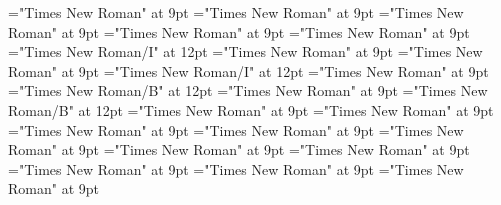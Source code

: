 \documentclass[gps1,twoside]{article}
\begin{document}
\font\spanspanrestrictionssensesensesentrybefore="Times New Roman" at 9pt
\font\spanrestrictionssensesensesentryfirstchildbefore="Times New Roman" at 9pt
\font\spanrestrictionssensesensesentrylastchildafter="Times New Roman" at 9pt
\font\spanspanlexsensereferencessensesensesentrybefore="Times New Roman" at 9pt
\font\lexsensereferencessensesensesentryafter="Times New Roman" at 9pt
\font\spanenownertypeabbreviationlexsensereferencelexsensereferencessensesensesentry="Times New Roman/I" at 12pt
\font\spanspanownertypeabbreviationlexsensereferencelexsensereferencessensesensesentrybefore="Times New Roman" at 9pt
\font\spanownertypeabbreviationlexsensereferencelexsensereferencessensesensesentrylastchildafter="Times New Roman" at 9pt
\font\spanownertypeabbreviationlexsensereferencelexsensereferencessensesensesentry="Times New Roman/I" at 12pt
\font\configtargetconfigtargetconfigtargetslexsensereferencelexsensereferencessensesensesentrybefore="Times New Roman" at 9pt
\font\spanbzhheadwordconfigtargetconfigtargetslexsensereferencelexsensereferencessensesensesentry="Times New Roman/B" at 12pt
\font\spanspanheadwordconfigtargetconfigtargetslexsensereferencelexsensereferencessensesensesentrybefore="Times New Roman" at 9pt
\font\spanheadwordconfigtargetconfigtargetslexsensereferencelexsensereferencessensesensesentry="Times New Roman/B" at 12pt
\font\variantformentrybackrefvariantformentrybackrefvariantformentrybackrefssensesensesentrybefore="Times New Roman" at 9pt
\font\variantformentrybackrefssensesensesentrybefore="Times New Roman" at 9pt
\font\variantformentrybackrefssensesensesentryafter="Times New Roman" at 9pt
\font\variantentrytypevariantentrytypevariantentrytypesvariantformentrybackrefvariantformentrybackrefssensesensesentrybefore="Times New Roman" at 9pt
\font\variantentrytypesvariantformentrybackrefvariantformentrybackrefssensesensesentryafter="Times New Roman" at 9pt
\font\spanspanreverseabbrvariantentrytypevariantentrytypesvariantformentrybackrefvariantformentrybackrefssensesensesentrybefore="Times New Roman" at 9pt
\font\spanreverseabbrvariantentrytypevariantentrytypesvariantformentrybackrefvariantformentrybackrefssensesensesentrylastchildafter="Times New Roman" at 9pt
\font\spanspanheadwordvariantformentrybackrefvariantformentrybackrefssensesensesentrybefore="Times New Roman" at 9pt
\font\spanspanowningentrysummarydefinitionvariantformentrybackrefvariantformentrybackrefssensesensesentrybefore="Times New Roman" at 9pt
\font\spanowningentrysummarydefinitionvariantformentrybackrefvariantformentrybackrefssensesensesentrylastchildafter="Times New Roman" at 9pt
\end{document}
